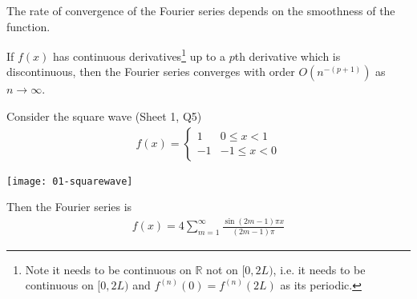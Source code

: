 \noindent The rate of convergence of the Fourier series depends on the smoothness of the function.
\begin{theorem}
    If $f(x)$ has continuous derivatives\footnote{Note it needs to be continuous on $\mathbb{R}$ not on $[0, 2L)$, i.e. it needs to be continuous on $[0, 2L)$ and $f^{(n)}(0) = f^{(n)}(2L)$ as its periodic.} up to a $p$th derivative which is discontinuous, then the Fourier series converges with order $O(n^{-(p+1)})$ as $n \to \infty$.
\end{theorem}
\begin{example}[$p = 0$]
    Consider the square wave (Sheet 1, Q5)
    \begin{align*}
        f(x) = \begin{cases}
            1  & 0 \leq x < 1  \\
            -1 & -1 \leq x < 0
        \end{cases}
    \end{align*}
    {\par \centering \texttt{[image: 01-squarewave]} \par}
    Then the Fourier series is
    \begin{align} \label{eq:1.7}
        f(x) = 4 \sum_{m=1}^\infty \frac{\sin (2m-1)\pi x}{(2m-1)\pi}
    \end{align}
\end{example}

